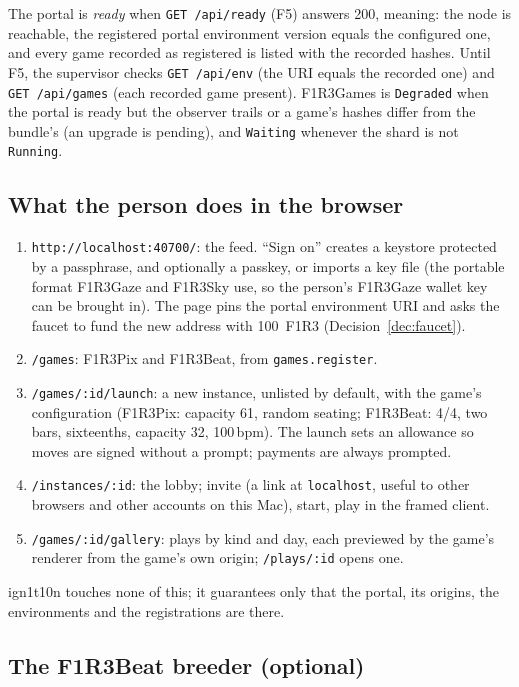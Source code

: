 \documentclass[11pt]{article}
\theoremstyle{definition}
\theoremstyle{remark}
\newcommand{\code}[1]{\texttt{#1}}
\newcommand{\Gz}{F1R3Gaze}
\newcommand{\Hr}{ign1t10n}
\newcommand{\Gm}{F1R3Games}
\begin{document}
The portal is \emph{ready} when \code{GET /api/ready} (F5) answers 200, meaning: the
node is reachable, the registered portal environment version equals the configured
one, and every game recorded as registered is listed with the recorded hashes. Until
F5, the supervisor checks \code{GET /api/env} (the URI equals the recorded one) and
\code{GET /api/games} (each recorded game present). \Gm{} is \code{Degraded} when the
portal is ready but the observer trails or a game's hashes differ from the bundle's
(an upgrade is pending), and \code{Waiting} whenever the shard is not \code{Running}.

\subsection{What the person does in the browser}\label{sec:journey}

\begin{enumerate}[nosep]
\item \code{http://localhost:40700/}: the feed. ``Sign on'' creates a keystore
  protected by a passphrase, and optionally a passkey, or imports a key file (the
  portable format \Gz{} and F1R3Sky use, so the person's \Gz{} wallet key can be
  brought in). The page pins the portal environment URI and asks the faucet to fund
  the new address with 100~F1R3 (Decision~\ref{dec:faucet}).
\item \code{/games}: F1R3Pix and F1R3Beat, from \code{games.register}.
\item \code{/games/:id/launch}: a new instance, unlisted by default, with the game's
  configuration (F1R3Pix: capacity 61, random seating; F1R3Beat: 4/4, two bars,
  sixteenths, capacity 32, 100\,bpm). The launch sets an allowance so moves are signed
  without a prompt; payments are always prompted.
\item \code{/instances/:id}: the lobby; invite (a link at \code{localhost}, useful to
  other browsers and other accounts on this Mac), start, play in the framed client.
\item \code{/games/:id/gallery}: plays by kind and day, each previewed by the game's
  renderer from the game's own origin; \code{/plays/:id} opens one.
\end{enumerate}

\noindent
\Hr{} touches none of this; it guarantees only that the portal, its origins, the
environments and the registrations are there.

\subsection{The F1R3Beat breeder (optional)}\label{sec:breeder}
\end{document}
